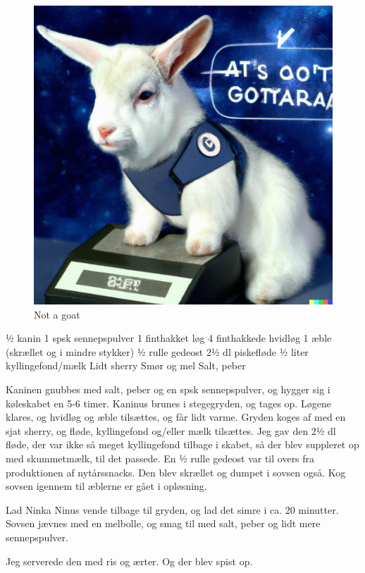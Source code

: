 \documentclass[
]{book}
\begin{document}
\begin{figure}
\centering
\includegraphics{images/DALL-E-notagoat.png}
\caption{Not a goat}
\end{figure}

½ kanin
1 spsk sennepspulver
1 finthakket løg
4 finthakkede hvidløg
1 æble (skrællet og i mindre stykker)
½ rulle gedeost
2½ dl piskefløde
½ liter kyllingefond/mælk
Lidt sherry
Smør og mel
Salt, peber

Kaninen gnubbes med salt, peber og en spsk sennepspulver, og hygger sig i køleskabet en 5-6 timer. Kaninus brunes i stegegryden, og tages op. Løgene klares, og hvidløg og æble tilsættes, og får lidt varme. Gryden koges af med en sjat sherry, og fløde, kyllingefond og/eller mælk tilsættes. Jeg gav den 2½ dl fløde, der var ikke så meget kyllingefond tilbage i skabet, så der blev suppleret op med skummetmælk, til det passede. En ½ rulle gedeost var til overs fra produktionen af nytårssnacks. Den blev skrællet og dumpet i sovsen også. Kog sovsen igennem til æblerne er gået i opløsning.

Lad Ninka Ninus vende tilbage til gryden, og lad det simre i ca. 20 minutter. Sovsen jævnes med en melbolle, og smag til med salt, peber og lidt mere sennepspulver.

Jeg serverede den med ris og ærter. Og der blev spist op.
\end{document}
